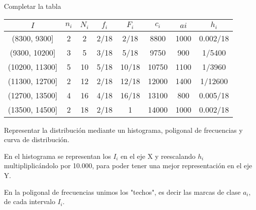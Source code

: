 \subproblem
Completar la tabla
\begin{center}
		\begin{center}
			\begin{tabular}{|c|c|c|c|c|c|c|c|}
				\hline
				$I$ & $n_{i}$ & $N_{i}$ & $f_{i}$ & $F_{i}$ & $c_{i}$ & $a{i}$ & $h_{i}$\\\hline
				(8300, 9300] & 2 & 2 & 2/18 & 2/18 & 8800 & 1000 & 0.002/18 \\ \hline
				(9300, 10200] & 3 & 5 & 3/18 & 5/18 & 9750 & 900 & 1/5400 \\ \hline
				(10200, 11300] & 5 & 10 & 5/18 & 10/18 & 10750 & 1100 & 1/3960 \\ \hline
				(11300, 12700] & 2 & 12 & 2/18 & 12/18 & 12000 & 1400 & 1/12600 \\ \hline
				(12700, 13500] & 4 & 16 & 4/18 & 16/18 & 13100 & 800 & 0.005/18 \\ \hline
				(13500, 14500] & 2 & 18 & 2/18 & 1 & 14000 & 1000 & 0.002/18\\ \hline
			\end{tabular}
		\end{center}
\end{center}
\subproblem
Representar la distribución mediante un histograma, poligonal de frecuencias y curva de
distribución.

\begin{center}
En el histograma se representan los $I_{i}$ en el eje X y reescalando $h_{i}$ multipliplicándolo por 10.000, para poder tener una mejor representación en el eje Y. 
\end{center}

\begin{center}
\end{center}

\begin{center}
En la poligonal de frecuencias unimos los "techos", es decir las marcas de clase $a_{i}$, de cada intervalo $I_{i}$.
\end{center}

